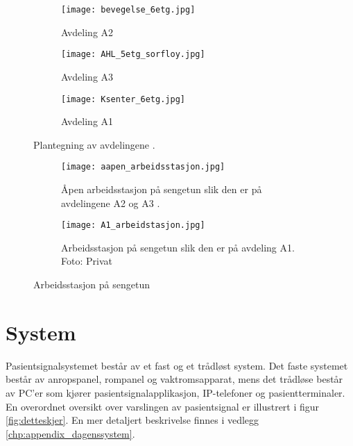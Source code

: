 \begin{figure}[H]
        \centering
        \begin{subfigure}[b]{1.0\textwidth}
        		\centering
				\texttt{[image: bevegelse\_6etg.jpg]}
				\caption{Avdeling A2}
				\label{fig:Bevegelse}
        \end{subfigure}
        
        \begin{subfigure}[b]{1.0\textwidth}
        		\centering
				\texttt{[image: AHL\_5etg\_sorfloy.jpg]}
				\caption{Avdeling A3}
				\label{fig:AHL}
        \end{subfigure}
        
        \begin{subfigure}[b]{1.0\textwidth}
        		\centering
				\texttt{[image: Ksenter\_6etg.jpg]}
				\caption{Avdeling A1}
				\label{fig:Ksenter}		
        \end{subfigure}
        \caption{Plantegning av avdelingene \citep{sykehuskart}.}
        \label{Plantegninger}
\end{figure}

\begin{figure}[H]
\centering
	\begin{subfigure}[b]{1.0\textwidth}
		\centering
		\texttt{[image: aapen\_arbeidsstasjon.jpg]}
		\caption{Åpen arbeidsstasjon på sengetun slik den er på avdelingene A2 og A3 \citep{sykehuskart}.}
		\label{fig:aapen_arbeidsstasjon}
	\end{subfigure}
	
	\begin{subfigure}[b]{1.0\textwidth}
		\centering
		\texttt{[image: A1\_arbeidstasjon.jpg]}
		\caption{Arbeidsstasjon på sengetun slik den er på avdeling A1. Foto: Privat}
		\label{fig:A1_arbeidsstasjon}
	\end{subfigure}
\caption{Arbeidsstasjon på sengetun}
\label{fig:arbeidsstasjon}
\end{figure}


\section{System}
\label{sec:system}
Pasientsignalsystemet består av et fast og et trådløst system. Det faste systemet består av anropspanel, rompanel og vaktromsapparat, mens det trådløse består av PC'er som kjører pasientsignalapplikasjon, IP-telefoner og pasientterminaler. En overordnet oversikt over varslingen av pasientsignal er illustrert i figur \ref{fig:detteskjer}. En mer detaljert beskrivelse finnes i vedlegg \ref{chp:appendix_dagenssystem}.

